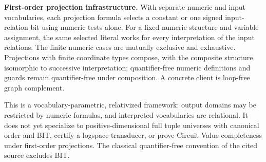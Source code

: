 \begin{result}
\textbf{First-order projection infrastructure.}
With separate numeric and input vocabularies, each projection formula selects a
constant or one signed input-relation bit using numeric tests alone. For a fixed
numeric structure and variable assignment, the same selected literal works for
every interpretation of the input relations. The finite numeric cases are
mutually exclusive and exhaustive. Projections with finite coordinate types
compose, with the composite structure isomorphic to successive interpretation;
quantifier-free numeric definitions and guards remain quantifier-free under
composition. A concrete client is loop-free graph complement.
\citep[Definitions 3.3--3.6]{ImmermanLandau1995}

This is a vocabulary-parametric, relativized framework: output domains may be
restricted by numeric formulas, and interpreted vocabularies are relational.
It does not yet specialize to positive-dimensional full tuple universes with
canonical order and BIT, certify a logspace transducer, or prove Circuit Value
completeness under first-order projections. The classical quantifier-free convention of the cited source
excludes BIT.
\end{result}

